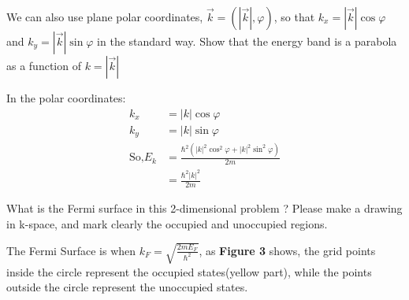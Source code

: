 \documentclass[answers]{exam}
\begin{document}
\begin{questions}
\question We can also use plane polar coordinates, $\vec{k}=(|\vec{k}|,\varphi)$, so that $k_{x}=|\vec{k}|\cos\varphi$ and $k_{y}=|\vec{k}|\sin\varphi$ in the standard way. Show that the energy band is a parabola as a function of $k=|\vec{k}|$
\begin{solution}
In the polar coordinates:
\begin{align*}
k_{x} &=|k| \cos \varphi \\
k_{y} &=|k| \sin \varphi \\
\text{So,} E_{k} &=\frac{\hbar^{2}\left(\left|k\right|^{2} \cos ^{2} \varphi+|k|^{2} \sin ^{2} \varphi\right)}{2 m}  \\
&=\frac{\hbar^{2} |\left.k\right|^{2}}{2 m}
\end{align*}
\end{solution}
\newpage
\question  What is the Fermi surface in this 2-dimensional problem ? Please make a drawing in k-space, and mark clearly the occupied and unoccupied regions.
\begin{solution}
The Fermi Surface is when $k_{F}=\sqrt{\frac{2 m E_{F}}{\hbar^{2}}}$, as \textbf{Figure 3} shows, the grid points inside the circle represent the occupied states(yellow part),
while the points outside the circle represent the unoccupied states. 
\end{solution}


\end{questions}
\end{document}
